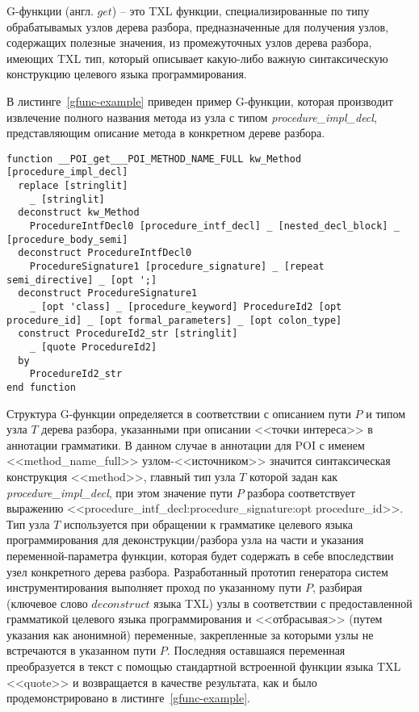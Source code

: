 G-функции (англ. $get$) -- это TXL функции, специализированные по типу обрабатывамых узлов дерева разбора, предназначенные для получения узлов, содержащих полезные значения, из промежуточных узлов дерева разбора, имеющих TXL тип, который описывает какую-либо важную синтаксическую конструкцию целевого языка программирования.

В листинге~\ref{gfunc-example} приведен пример G-функции, которая производит извлечение полного названия метода из узла с типом \textit{procedure\_impl\_decl}, представляющим описание метода в конкретном дереве разбора.

\begin{lstlisting}[frame=single, language=TXL, label={gfunc-example}, caption={Пример синтезированной G-функции.}]
function __POI_get___POI_METHOD_NAME_FULL kw_Method [procedure_impl_decl]
  replace [stringlit]
    _ [stringlit]
  deconstruct kw_Method
    ProcedureIntfDecl0 [procedure_intf_decl] _ [nested_decl_block] _ [procedure_body_semi]
  deconstruct ProcedureIntfDecl0
    ProcedureSignature1 [procedure_signature] _ [repeat semi_directive] _ [opt ';]
  deconstruct ProcedureSignature1
    _ [opt 'class] _ [procedure_keyword] ProcedureId2 [opt procedure_id] _ [opt formal_parameters] _ [opt colon_type]
  construct ProcedureId2_str [stringlit]
    _ [quote ProcedureId2]
  by
    ProcedureId2_str
end function
\end{lstlisting}

Структура G-функции определяется в соответствии с описанием пути $P$ и типом узла $T$ дерева разбора, указанными при описании <<точки интереса>> в аннотации грамматики.
В данном случае в аннотации для POI с именем <<method\_name\_full>> узлом-<<источником>> значится синтаксическая конструкция <<method>>, главный тип узла $T$ которой задан как \textit{procedure\_impl\_decl}, при этом значение пути $P$ разбора соответствует выражению <<procedure\_intf\_decl:procedure\_signature:opt procedure\_id>>.
Тип узла $T$ используется при обращении к грамматике целевого языка программирования для деконструкции/разбора узла на части и указания переменной-параметра функции, которая будет содержать в себе впоследствии узел конкретного дерева разбора.
Разработанный прототип генератора систем инструментирования выполняет проход по указанному пути $P$, разбирая (ключевое слово $deconstruct$ языка TXL) узлы в соответствии с предоставленной грамматикой целевого языка программирования и <<отбрасывая>> (путем указания как анонимной) переменные, закрепленные за которыми узлы не встречаются в указанном пути $P$.
Последняя оставшаяся переменная преобразуется в текст с помощью стандартной встроенной функции языка TXL <<quote>> и возвращается в качестве результата, как и было продемонстрировано в листинге~\ref{gfunc-example}.

